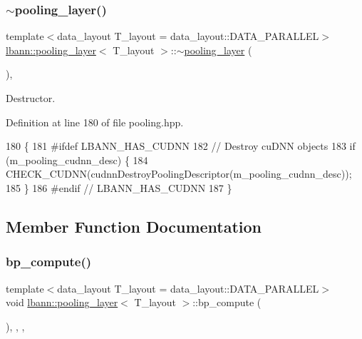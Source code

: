 \subsubsection{\texorpdfstring{$\sim$pooling\+\_\+layer()}{~pooling\_layer()}}
{\footnotesize\ttfamily template$<$data\+\_\+layout T\+\_\+layout = data\+\_\+layout\+::\+D\+A\+T\+A\+\_\+\+P\+A\+R\+A\+L\+L\+EL$>$ \\
\hyperlink{classlbann_1_1pooling__layer}{lbann\+::pooling\+\_\+layer}$<$ T\+\_\+layout $>$\+::$\sim$\hyperlink{classlbann_1_1pooling__layer}{pooling\+\_\+layer} (\begin{DoxyParamCaption}{ }\end{DoxyParamCaption})\hspace{0.3cm}{\ttfamily [inline]}, {\ttfamily [override]}}



Destructor. 



Definition at line 180 of file pooling.\+hpp.


\begin{DoxyCode}
180                             \{
181 \textcolor{preprocessor}{  #ifdef LBANN\_HAS\_CUDNN}
182     \textcolor{comment}{// Destroy cuDNN objects}
183     \textcolor{keywordflow}{if} (m\_pooling\_cudnn\_desc) \{
184       CHECK\_CUDNN(cudnnDestroyPoolingDescriptor(m\_pooling\_cudnn\_desc));
185     \}
186 \textcolor{preprocessor}{  #endif // LBANN\_HAS\_CUDNN}
187   \}
\end{DoxyCode}


\subsection{Member Function Documentation}
\mbox{\label{classlbann_1_1pooling__layer_ab58fe97e976f60df37f958e79fd56ff9}} 
\subsubsection{\texorpdfstring{bp\+\_\+compute()}{bp\_compute()}}
{\footnotesize\ttfamily template$<$data\+\_\+layout T\+\_\+layout = data\+\_\+layout\+::\+D\+A\+T\+A\+\_\+\+P\+A\+R\+A\+L\+L\+EL$>$ \\
void \hyperlink{classlbann_1_1pooling__layer}{lbann\+::pooling\+\_\+layer}$<$ T\+\_\+layout $>$\+::bp\+\_\+compute (\begin{DoxyParamCaption}{ }\end{DoxyParamCaption})\hspace{0.3cm}{\ttfamily [inline]}, {\ttfamily [override]}, {\ttfamily [protected]}, {\ttfamily [virtual]}}

